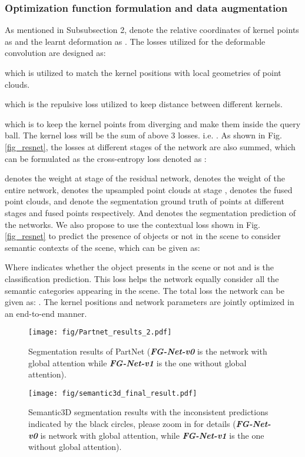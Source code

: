 \documentclass[journal]{IEEEtran}
\begin{document}
\subsubsection{Optimization function formulation and data augmentation}
As mentioned in Subsubsection 2, denote the relative coordinates of kernel points as  and the learnt deformation as . The losses utilized for the deformable convolution are designed as:

which is utilized to match the kernel positions with local geometries of point clouds.

which is the repulsive loss utilized to keep distance between different kernels.

which is to keep the kernel points from diverging and make them inside the query ball. The kernel loss will be the sum of above 3 losses. i.e. .
As shown in Fig. \ref{fig_resnet}, the losses at different stages of the network are also summed, which can be formulated as the cross-entropy loss denoted as :

 denotes the weight at stage  of the residual network,  denotes the weight of the entire network,  denotes the upsampled point clouds at stage ,  denotes the fused point clouds,  and  denote the segmentation ground truth of points at different stages and fused points respectively. And  denotes the segmentation prediction of the networks. We also propose to use the contextual loss shown in Fig. \ref{fig_resnet} to predict the presence of objects or not in the scene to consider semantic contexts of the scene, which can be given as:

Where  indicates whether the object presents in the scene or not and  is the classification prediction. This loss helps the network equally consider all the semantic categories appearing in the scene.
The total loss the network can be given as: . The kernel positions and network parameters are jointly optimized in an end-to-end manner. 



\begin{figure}[bp]
\centering
\texttt{[image: fig/Partnet\_results\_2.pdf]}
\caption{Segmentation results of PartNet (\textit{\textbf{FG-Net-v0}} is the network with global attention while \textit{\textbf{FG-Net-v1}} is the one without global attention).}
\label{fig_partnet}
\end{figure}


\begin{figure*}[ht]
\centering
\texttt{[image: fig/semantic3d\_final\_result.pdf]}
\caption{Semantic3D segmentation results with the inconsistent predictions indicated by the black circles, please zoom in for details (\textit{\textbf{FG-Net-v0}} is network with global attention, while \textit{\textbf{FG-Net-v1}} is the one without global attention).}
\label{fig_Sem3D}
\end{figure*}
\end{document}
